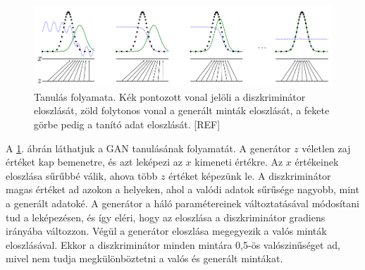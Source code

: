

\begin{figure}[ht]
	\centering
	\includegraphics[width=1\columnwidth]{figures/gan_dist.png}
	\caption{Tanulás folyamata. Kék pontozott vonal jelöli a diszkriminátor eloszlását, zöld folytonos vonal a generált minták eloszlását, a fekete görbe pedig a tanító adat eloszlását. [REF]}
	\label{fig:gan_dist}
\end{figure}

A \ref{fig:gan_dist}. ábrán láthatjuk a GAN tanulásának folyamatát. A generátor $z$ véletlen zaj értéket kap bemenetre, és azt leképezi az $x$ kimeneti értékre. Az $x$ értékeinek eloszlása sűrűbbé válik, ahova több $z$ értéket képezünk le. A diszkriminátor magas értéket ad azokon a helyeken, ahol a valódi adatok sűrűsége nagyobb, mint a generált adatoké. A generátor a háló paramétereinek változtatásával módosítani tud a leképezésen, és így eléri, hogy az eloszlása a diszkriminátor gradiens irányába változzon. Végül a generátor eloszlása megegyezik a valós minták eloszlásával. Ekkor a diszkriminátor minden mintára 0,5-ös valószinűséget ad, mivel nem tudja megkülönböztetni a valós és generált mintákat.



